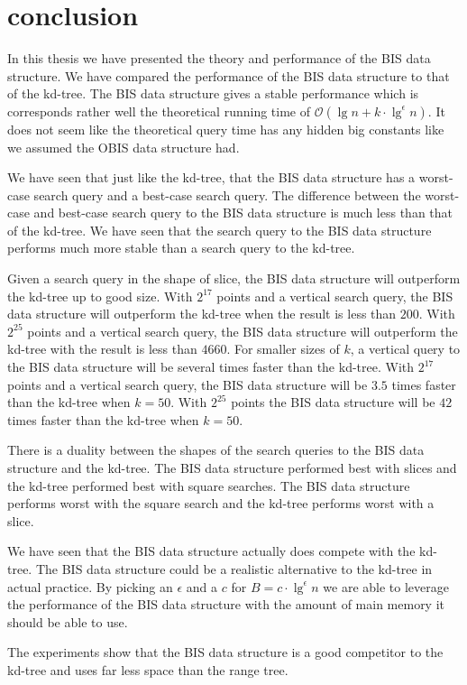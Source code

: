 \chapter{conclusion}
\label{ch:conclusion}

In this thesis we have presented the theory and performance of the BIS data structure. We have compared the performance of the BIS data structure to that of the kd-tree. The BIS data structure gives a stable performance which is corresponds rather well the theoretical running time of $\mathcal{O}(\lg n + k\cdot\lg^\epsilon n)$. It does not seem like the theoretical query time has any hidden big constants like we assumed the OBIS data structure had.

We have seen that just like the kd-tree, that the BIS data structure has a worst-case search query and a best-case search query. The difference between the worst-case and best-case search query to the BIS data structure is much less than that of the kd-tree. We have seen that the search query to the BIS data structure performs much more stable than a search query to the kd-tree.

Given a search query in the shape of slice, the BIS data structure will outperform the kd-tree up to good size. With $2^{17}$ points and a vertical search query, the BIS data structure will outperform the kd-tree when the result is less than $200$. With $2^{25}$ points and a vertical search query, the BIS data structure will outperform the kd-tree with the result is less than $4660$. For smaller sizes of $k$, a vertical query to the BIS data structure will be several times faster than the kd-tree. With $2^{17}$ points and a vertical search query, the BIS data structure will be $3.5$ times faster than the kd-tree when $k = 50$. With $2^{25}$ points the BIS data structure will be $42$ times faster than the kd-tree when $k = 50$. 

There is a duality between the shapes of the search queries to the BIS data structure and the kd-tree. The BIS data structure performed best with slices and the kd-tree performed best with square searches. The BIS data structure performs worst with the square search and the kd-tree performs worst with a slice.

We have seen that the BIS data structure actually does compete with the kd-tree. The BIS data structure could be a realistic alternative to the kd-tree in actual practice. By picking an $\epsilon$ and a $c$ for $B = c\cdot\lg^\epsilon n$ we are able to leverage the performance of the BIS data structure with the amount of main memory it should be able to use.

The experiments show that the BIS data structure is a good competitor to the kd-tree and uses far less space than the range tree.
